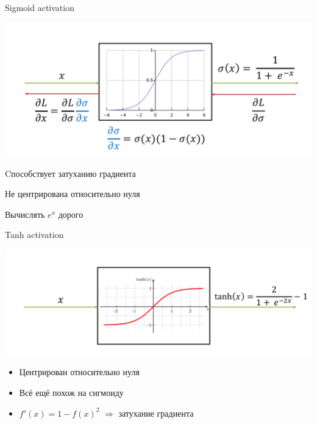 \documentclass[notes,12pt, aspectratio=169]{beamer}
\begin{document}
\begin{frame}{Sigmoid activation}
\begin{center}
\includegraphics[width=.65\linewidth]{sigmoid_activation_2.png}
\end{center}

\begin{itemize}
{\color{red} 
\item Cпособствует затуханию градиента

\item Не центрирована относительно нуля

\item Вычислять $e^x$ дорого
}
\end{itemize}
\end{frame}


\begin{frame}{Tanh activation}
\begin{center}
\includegraphics[width=.7\linewidth]{tanh_activation.png}
\end{center}

\begin{itemize}
\item  {\color{green}  Центрирован относительно нуля }

\item  {\color{red}  Всё ещё похож на сигмоиду }

\item $f'(x) = 1 - f(x)^2$  $\Rightarrow$ затухание градиента
\end{itemize}
\end{frame}
\end{document}
